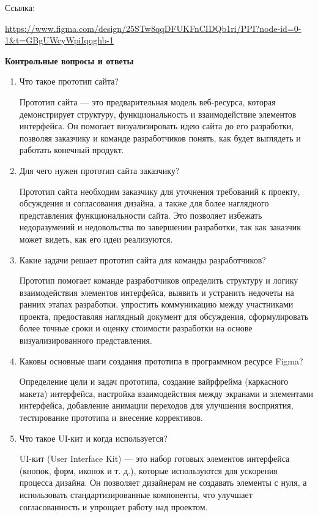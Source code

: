 Ссылка:

\url{https://www.figma.com/design/25STw8qqDFUKFnCIDQb1ri/PPI?node-id=0-1&t=GBgUWcyWpiIqqghb-1}
\bigskip

\textbf{Контрольные вопросы и ответы}

\begin{enumerate}
    \item Что такое прототип сайта?

        Прототип сайта — это предварительная модель веб-ресурса, которая демонстрирует структуру, функциональность и взаимодействие элементов интерфейса. Он помогает визуализировать идею сайта до его разработки, позволяя заказчику и команде разработчиков понять, как будет выглядеть и работать конечный продукт.

    \item Для чего нужен прототип сайта заказчику?

        Прототип сайта необходим заказчику для уточнения требований к проекту, обсуждения и согласования дизайна, а также для более наглядного представления функциональности сайта. Это позволяет избежать недоразумений и недовольства по завершении разработки, так как заказчик может видеть, как его идеи реализуются.

    \item Какие задачи решает прототип сайта для команды разработчиков?

        Прототип помогает команде разработчиков определить структуру и логику взаимодействия элементов интерфейса,
    выявить и устранить недочеты на ранних этапах разработки,
    упростить коммуникацию между участниками проекта, предоставляя наглядный документ для обсуждения,
    сформулировать более точные сроки и оценку стоимости разработки на основе визуализированного представления.

    \item Каковы основные шаги создания прототипа в программном ресурсе Figma?

    Определение цели и задач прототипа,
    создание вайрфрейма (каркасного макета) интерфейса,
    настройка взаимодействия между экранами и элементами интерфейса,
    добавление анимации переходов для улучшения восприятия,
    тестирование прототипа и внесение коррективов.

\item Что такое UI-кит и когда используется?

    UI-кит (User Interface Kit) — это набор готовых элементов интерфейса (кнопок, форм, иконок и т. д.), которые используются для ускорения процесса дизайна. Он позволяет дизайнерам не создавать элементы с нуля, а использовать стандартизированные компоненты, что улучшает согласованность и упрощает работу над проектом.
\end{enumerate}


